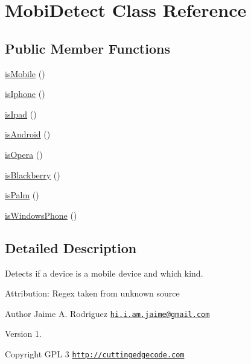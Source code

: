 \hypertarget{class_mobi_detect}{\section{Mobi\-Detect Class Reference}
\label{class_mobi_detect}
}
\subsection*{Public Member Functions}
\begin{DoxyCompactItemize}
\item 
\hyperlink{class_mobi_detect_aa03affe506ea70c6d04fab89fee473fc}{is\-Mobile} ()
\item 
\hyperlink{class_mobi_detect_abef4c1a6a8052c28a3c2dec49d3f9e9b}{is\-Iphone} ()
\item 
\hyperlink{class_mobi_detect_a2d202f72c3038ed6852aebff550dc531}{is\-Ipad} ()
\item 
\hyperlink{class_mobi_detect_abcbe8c4d1560467d47a8e19fe4554c85}{is\-Android} ()
\item 
\hyperlink{class_mobi_detect_a8a2049e411c252249d5264f87f2a894c}{is\-Opera} ()
\item 
\hyperlink{class_mobi_detect_a5eea8483425fa1d463e9df4b9e6f955b}{is\-Blackberry} ()
\item 
\hyperlink{class_mobi_detect_a1342be6bfbf8c34d00c89b8a880ac61e}{is\-Palm} ()
\item 
\hyperlink{class_mobi_detect_abd0a3ffcb33cbef4d23adbede9e3fcd4}{is\-Windows\-Phone} ()
\end{DoxyCompactItemize}


\subsection{Detailed Description}
Detects if a device is a mobile device and which kind.

Attribution\-: Regex taken from unknown source

\begin{DoxyAuthor}{Author}
Jaime A. Rodriguez \href{mailto:hi.i.am.jaime@gmail.com}{\tt hi.\-i.\-am.\-jaime@gmail.\-com} 
\end{DoxyAuthor}
\begin{DoxyVersion}{Version}
1. 
\end{DoxyVersion}
\begin{DoxyCopyright}{Copyright}
G\-P\-L 3 \href{http://cuttingedgecode.com}{\tt http\-://cuttingedgecode.\-com} 
\end{DoxyCopyright}


